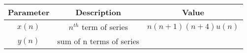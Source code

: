\begin{tabular}{|c|c|c|}
\hline
\textbf{Parameter} & \textbf{Description} & \textbf{Value} \\
\hline
$x(n)$ & $n^{th}$ term of series & $n(n+1)(n+4)u(n)$\\
\hline
$y(n)$ & sum of n terms of series&\\
\hline
\end{tabular}
